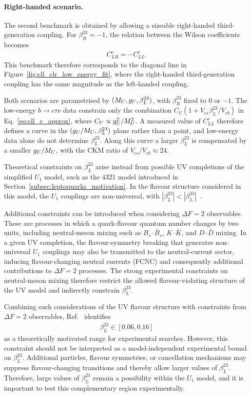 \paragraph{Right-handed scenario.}
The second benchmark is obtained by allowing a sizeable right-handed third-generation coupling. For $\beta_{R}^{33}=-1$, the relation between the Wilson coefficients becomes
\begin{align*}
    C_{LR}^{c}=-C_{LL}^{c}.
\end{align*}
This benchmark therefore corresponds to the diagonal line in Figure~\ref{fig:cll_clr_low_energy_fit}, where the right-handed third-generation coupling has the same magnitude as the left-handed coupling.

Both scenarios are parametrised by $(M_U,g_U,\beta_L^{23})$, with $\beta_R^{33}$ fixed to $0$ or $-1$. The low-energy $b\rightarrow c\tau\nu$ data constrain only the combination $C_{U}(1+V_{cs}\beta_L^{23}/V_{cb})$ in Eq.~\eqref{eq:cll_c_approx}, where $C_{U}\propto g_U^{2}/M_U^{2}$. A measured value of $C_{LL}^{c}$ therefore defines a curve in the $(g_U/M_U,\beta_L^{23})$ plane rather than a point, and low-energy data alone do not determine $\beta_L^{23}$. Along this curve a larger $\beta_L^{23}$ is compensated by a smaller $g_U/M_U$, with the CKM ratio of $V_{cs}/V_{cb}\approx24$.

Theoretical constraints on $\beta_L^{23}$ arise instead from possible UV completions of the simplified $U_{1}$ model, such as the 4321 model introduced in Section~\ref{subsec:leptoquarks_motivation}. In the flavour structure considered in this model, the $U_1$ couplings are non-universal, with $|\beta_{L}^{23}|<|\beta_{L}^{33}|$~\cite{Cornella2019}.

Additional constraints can be introduced when considering $\Delta F=2$ observables. These are processes in which a quark-flavour quantum number changes by two units, including neutral-meson mixing such as $B_s$--$\bar{B}_s$, $K$--$\bar{K}$, and $D$--$\bar{D}$ mixing. In a given UV completion, the flavour-symmetry breaking that generates non-universal $U_{1}$ couplings may also be transmitted to the neutral-current sector, inducing flavour-changing neutral currents (FCNC) and consequently additional contributions to $\Delta F=2$ processes. The strong experimental constraints on neutral-meson mixing therefore restrict the allowed flavour-violating structure of the UV model and indirectly constrain $\beta_{L}^{23}$.

Combining such considerations of the UV flavour structure with constraints from $\Delta F=2$ observables, Ref.~\cite{Aebischer2022} identifies
\begin{align*}
\beta_{L}^{23}\in[0.06,0.16]
\end{align*} as a theoretically motivated range for experimental searches. However, this constraint should not be interpreted as a model-independent experimental bound on $\beta_{L}^{23}$. Additional particles, flavour symmetries, or cancellation mechanisms may suppress flavour-changing transitions and thereby allow larger values of $\beta_{L}^{23}$. Therefore, large values of $\beta_{L}^{23}$ remain a possibility within the $U_{1}$ model, and it is important to test this complementary region experimentally.

